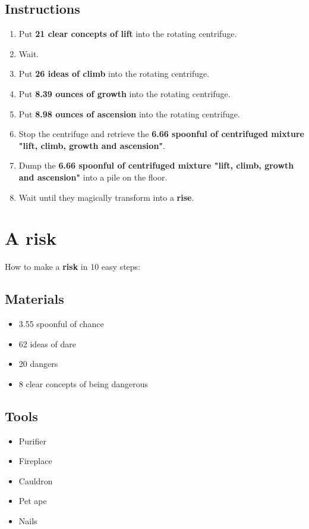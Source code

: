 \documentclass{article}
\begin{document}
\subsection{Instructions}\begin{enumerate}
\item 
Put \textbf{21 clear concepts of lift} into the rotating centrifuge.
\item 
Wait.
\item 
Put \textbf{26 ideas of climb} into the rotating centrifuge.
\item 
Put \textbf{8.39 ounces of growth} into the rotating centrifuge.
\item 
Put \textbf{8.98 ounces of ascension} into the rotating centrifuge.
\item 
Stop the centrifuge and retrieve the \textbf{6.66 spoonful of centrifuged mixture "lift, climb, growth and ascension"}.
\item 
Dump the \textbf{6.66 spoonful of centrifuged mixture "lift, climb, growth and ascension"} into a pile on the floor.
\item 
Wait until they magically transform into a \textbf{rise}.
\end{enumerate}
\newpage
\section{A risk}How to make a \textbf{risk} in 10 easy steps:

\subsection{Materials}\begin{itemize}
\item 
3.55 spoonful of chance
\item 
62 ideas of dare
\item 
20 dangers
\item 
8 clear concepts of being dangerous
\end{itemize}
\subsection{Tools}\begin{itemize}
\item 
Purifier
\item 
Fireplace
\item 
Cauldron
\item 
Pet ape
\item 
Nails
\end{itemize}
\end{document}
